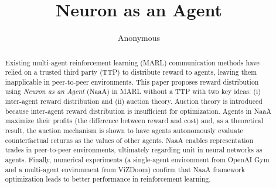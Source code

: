 \documentclass{article} %
\title{Neuron as an Agent}
\author{Anonymous}
\begin{document}
\maketitle

\begin{abstract}
Existing multi-agent reinforcement learning (MARL) communication methods have relied on a trusted third party (TTP) to distribute reward to agents, leaving them inapplicable in peer-to-peer environments. This paper proposes reward distribution using {\em Neuron as an Agent} (NaaA) in MARL without a TTP with two key ideas: (i) inter-agent reward distribution and (ii) auction theory. Auction theory is introduced because inter-agent reward distribution is insufficient for optimization. Agents in NaaA maximize their profits (the difference between reward and cost) and, as a theoretical result, the auction mechanism is shown to have agents autonomously evaluate counterfactual returns as the values of other agents. NaaA enables representation trades in peer-to-peer environments, ultimately regarding unit in neural networks as agents. Finally, numerical experiments (a single-agent environment from OpenAI Gym and a multi-agent environment from ViZDoom) confirm that NaaA framework optimization leads to better performance in reinforcement learning.
\end{abstract}











\end{document}
